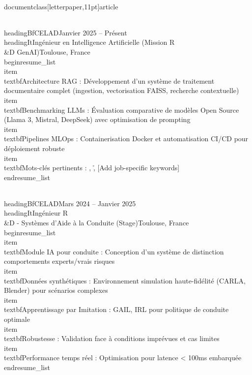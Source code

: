 \\documentclass[letterpaper,11pt]{article}
\begin{document}
\\headingBf{CELAD}{Janvier 2025 -- Présent}
\\headingIt{Ingénieur en Intelligence Artificielle (Mission R\\&D GenAI)}{Toulouse, France}
\\begin{resume_list}
  \\item \\textbf{Architecture RAG :} Développement d'un système de traitement documentaire complet (ingestion, vectorisation FAISS, recherche contextuelle)
  \\item \\textbf{Benchmarking LLMs :} Évaluation comparative de modèles Open Source (Llama 3, Mistral, DeepSeek) avec optimisation de prompting
  \\item \\textbf{Pipelines MLOps :} Containerisation Docker et automatisation CI/CD pour déploiement robuste
  \\item \\textbf{Mots-clés pertinents :} \python, \r, [Add job-specific keywords]
\\end{resume_list}

\\headingBf{CELAD}{Mars 2024 -- Janvier 2025}
\\headingIt{Ingénieur R\\&D - Systèmes d'Aide à la Conduite (Stage)}{Toulouse, France}
\\begin{resume_list}
  \\item \\textbf{Module IA pour conduite :} Conception d'un système de distinction comportements experts/vrais risques
  \\item \\textbf{Données synthétiques :} Environnement simulation haute-fidélité (CARLA, Blender) pour scénarios complexes
  \\item \\textbf{Apprentissage par Imitation :} GAIL, IRL pour politique de conduite optimale
  \\item \\textbf{Robustesse :} Validation face à conditions imprévues et cas limites
  \\item \\textbf{Performance temps réel :} Optimisation pour latence < 100ms embarquée
\\end{resume_list}
\end{document}
